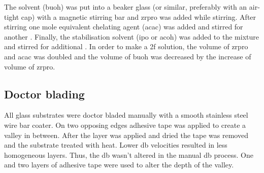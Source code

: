 The solvent (\gls{buoh}) was put into a beaker glass (or similar, preferably with an 
air-tight cap) with a magnetic stirring bar and \gls{zrpro} was added while stirring. After 
stirring  one mole equivalent chelating agent (\gls{acac}) was 
added and stirred for another . Finally, the stabilisation 
solvent\cite{Hu2016} (\gls{ipo} or \gls{acoh}) was added to the mixture and stirred for 
additional . 
In order to make a \gls{2f} solution, the volume of \gls{zrpro} and \gls{acac} was 
doubled and the volume of \gls{buoh} was decreased by the increase of volume of \gls{zrpro}. 

\subsection{Doctor blading}
\label{sec:DB}
All glass substrates were doctor bladed manually with a smooth stainless steel wire bar 
coater. On two opposing edges adhesive tape was applied to create a valley in between. After the 
layer was applied and dried the tape was removed and the substrate treated with heat.
Lower \gls{db} velocities resulted in less homogeneous layers.
Thus, the \gls{db} wasn't altered in the manual \gls{db} process. 
One and two layers of adhesive tape were used to alter the depth of the valley. 

